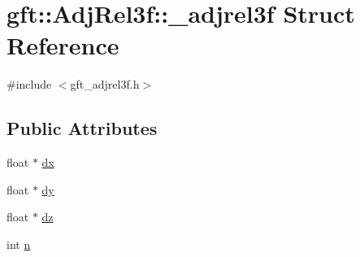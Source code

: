 \hypertarget{structgft_1_1AdjRel3f_1_1__adjrel3f}{\section{gft\-:\-:Adj\-Rel3f\-:\-:\-\_\-adjrel3f Struct Reference}
\label{structgft_1_1AdjRel3f_1_1__adjrel3f}
}


{\ttfamily \#include $<$gft\-\_\-adjrel3f.\-h$>$}

\subsection*{Public Attributes}
\begin{DoxyCompactItemize}
\item 
float $\ast$ \hyperlink{structgft_1_1AdjRel3f_1_1__adjrel3f_a01376a362ee6239ec87f0698a0bbdbaf}{dx}
\item 
float $\ast$ \hyperlink{structgft_1_1AdjRel3f_1_1__adjrel3f_a218f31b93e97d95f354d7e20ab005802}{dy}
\item 
float $\ast$ \hyperlink{structgft_1_1AdjRel3f_1_1__adjrel3f_a9f5466eaebc904592f473a52da0f9127}{dz}
\item 
int \hyperlink{structgft_1_1AdjRel3f_1_1__adjrel3f_af1b74ab4843c76ffb8aef6ebcd06b086}{n}
\end{DoxyCompactItemize}


